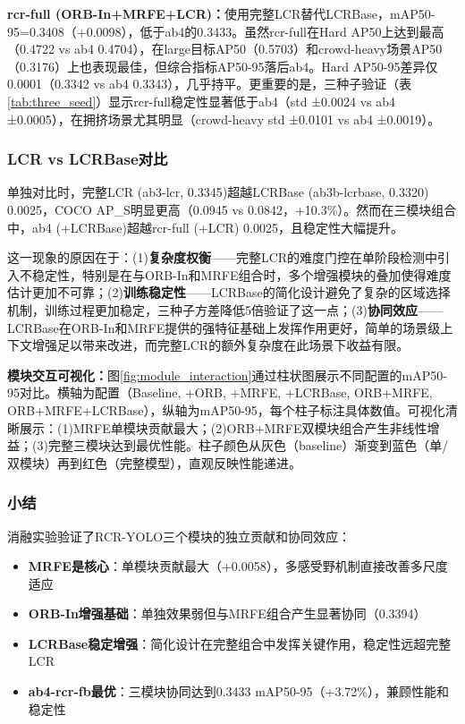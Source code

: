 \documentclass[journal]{IEEEtran}
\begin{document}
\textbf{rcr-full (ORB-In+MRFE+LCR)：}使用完整LCR替代LCRBase，mAP50-95=0.3408（+0.0098），低于ab4的0.3433。虽然rcr-full在Hard AP50上达到最高（0.4722 vs ab4 0.4704），在large目标AP50（0.5703）和crowd-heavy场景AP50（0.3176）上也表现最佳，但综合指标AP50-95落后ab4。Hard AP50-95差异仅0.0001（0.3342 vs ab4 0.3343），几乎持平。更重要的是，三种子验证（表\ref{tab:three_seed}）显示rcr-full稳定性显著低于ab4（std ±0.0024 vs ab4 ±0.0005），在拥挤场景尤其明显（crowd-heavy std ±0.0101 vs ab4 ±0.0019）。

\subsubsection{LCR vs LCRBase对比}

单独对比时，完整LCR (ab3-lcr, 0.3345)超越LCRBase (ab3b-lcrbase, 0.3320) 0.0025，COCO AP\_S明显更高（0.0945 vs 0.0842，+10.3\%）。然而在三模块组合中，ab4 (+LCRBase)超越rcr-full (+LCR) 0.0025，且稳定性大幅提升。

这一现象的原因在于：(1)\textbf{复杂度权衡}——完整LCR的难度门控在单阶段检测中引入不稳定性，特别是在与ORB-In和MRFE组合时，多个增强模块的叠加使得难度估计更加不可靠；(2)\textbf{训练稳定性}——LCRBase的简化设计避免了复杂的区域选择机制，训练过程更加稳定，三种子方差降低5倍验证了这一点；(3)\textbf{协同效应}——LCRBase在ORB-In和MRFE提供的强特征基础上发挥作用更好，简单的场景级上下文增强足以带来改进，而完整LCR的额外复杂度在此场景下收益有限。

\textbf{模块交互可视化：}图\ref{fig:module_interaction}通过柱状图展示不同配置的mAP50-95对比。横轴为配置（Baseline, +ORB, +MRFE, +LCRBase, ORB+MRFE, ORB+MRFE+LCRBase），纵轴为mAP50-95，每个柱子标注具体数值。可视化清晰展示：(1)MRFE单模块贡献最大；(2)ORB+MRFE双模块组合产生非线性增益；(3)完整三模块达到最优性能。柱子颜色从灰色（baseline）渐变到蓝色（单/双模块）再到红色（完整模型），直观反映性能递进。

\subsubsection{小结}

消融实验验证了RCR-YOLO三个模块的独立贡献和协同效应：
\begin{itemize}
    \item \textbf{MRFE是核心}：单模块贡献最大（+0.0058），多感受野机制直接改善多尺度适应
    \item \textbf{ORB-In增强基础}：单独效果弱但与MRFE组合产生显著协同（0.3394）
    \item \textbf{LCRBase稳定增强}：简化设计在完整组合中发挥关键作用，稳定性远超完整LCR
    \item \textbf{ab4-rcr-fb最优}：三模块协同达到0.3433 mAP50-95（+3.72\%），兼顾性能和稳定性
\end{itemize}
\end{document}
